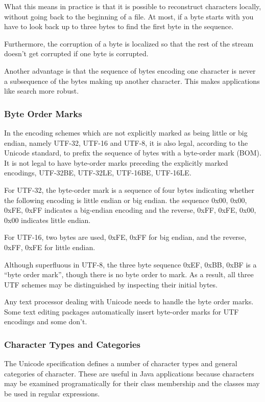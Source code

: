 What this means in practice is that it is possible to reconstruct
characters locally, without going back to the beginning of a file.
At most, if a byte starts with  you have to look back
up to three bytes to find the first byte in the sequence.

Furthermore, the corruption of a byte is localized so that the rest of
the stream doesn't get corrupted if one byte is corrupted.

Another advantage is that the sequence of bytes encoding one character
is never a subsequence of the bytes making up another character.  This
makes applications like search more robust.


\subsubsection{Byte Order Marks}\label{section:byte-order-marks}

In the encoding schemes which are not explicitly marked as being
little or big endian, namely UTF-32, UTF-16 and UTF-8, it is also
legal, according to the Unicode standard, to prefix the sequence of
bytes with a byte-order mark (BOM).  It is not legal to have
byte-order marks preceding the explicitly marked encodings, UTF-32BE,
UTF-32LE, UTF-16BE, UTF-16LE.

For UTF-32, the byte-order mark is a sequence of four bytes indicating
whether the following encoding is little endian or big endian.  the
sequence 0x00, 0x00, 0xFE, 0xFF indicates a big-endian encoding and
the reverse, 0xFF, 0xFE, 0x00, 0x00 indicates little endian.

For UTF-16, two bytes are used, 0xFE, 0xFF for big endian, and the
reverse, 0xFF, 0xFE for little endian.

Although superfluous in UTF-8, the three byte sequence 0xEF, 0xBB,
0xBF is a ``byte order mark'', though there is no byte order to mark.  
As a result, all three UTF schemes may be distinguished by inspecting
their initial bytes.

Any text processor dealing with Unicode needs to handle the byte order
marks.  Some text editing packages automatically insert byte-order
marks for UTF encodings and some don't.

\subsubsection{Character Types and Categories}\label{section:unicode-categories}

The Unicode specification defines a number of character types and
general categories of character.  These are useful in Java
applications because characters may be examined programatically for
their class membership and the classes may be used in regular
expressions.

